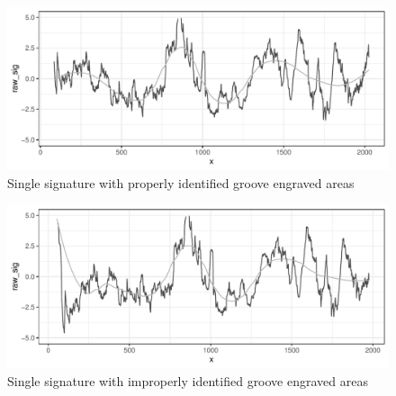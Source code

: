 \documentclass[12pt]{article}\usepackage[]{graphicx}\usepackage[]{color}
\makeatletter
\def\maxwidth{ %
  \ifdim\Gin@nat@width>\linewidth
    \linewidth
  \else
    \Gin@nat@width
  \fi
}
\newenvironment{knitrout}{}{} %
\theoremstyle{nonumberplain}
\makeatother
\begin{document}
\begin{knitrout}
\color{fgcolor}\begin{figure}

{\centering \includegraphics[width=\maxwidth]{figure/r_signal-motivation-good-1} 

}

\caption[Single signature with properly identified groove engraved areas]{Single signature with properly identified groove engraved areas}\label{fig:r signal-motivation-good}
\end{figure}


\end{knitrout}


\begin{knitrout}
\color{fgcolor}\begin{figure}

{\centering \includegraphics[width=\maxwidth]{figure/r_signal-motivation-bad-1} 

}

\caption[Single signature with improperly identified groove engraved areas]{Single signature with improperly identified groove engraved areas}\label{fig:r signal-motivation-bad}
\end{figure}


\end{knitrout}
\end{document}
